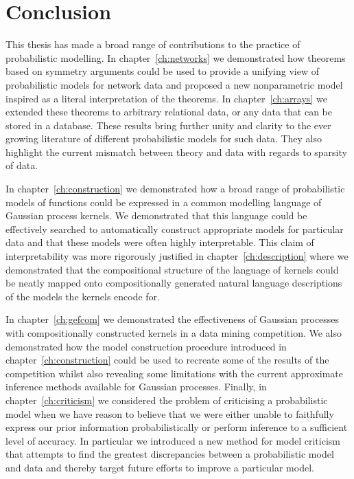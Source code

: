 
\inbpdocument

\chapter{Conclusion}
\label{ch:conclusion}

This thesis has made a broad range of contributions to the practice of probabilistic modelling.
In chapter~\ref{ch:networks} we demonstrated how theorems based on symmetry arguments could be used to provide a unifying view of probabilistic models for network data and proposed a new nonparametric model inspired as a literal interpretation of the theorems.
In chapter~\ref{ch:arrays} we extended these theorems to arbitrary relational data, or any data that can be stored in a database.
These results bring further unity and clarity to the ever growing literature of different probabilistic models for such data.
They also highlight the current mismatch between theory and data with regards to sparsity of data.

In chapter~\ref{ch:construction} we demonstrated how a broad range of probabilistic models of functions could be expressed in a common modelling language of Gaussian process kernels.
We demonstrated that this language could be effectively searched to automatically construct appropriate models for particular data and that these models were often highly interpretable.
This claim of interpretability was more rigorously justified in chapter~\ref{ch:description} where we demonstrated that the compositional structure of the language of kernels could be neatly mapped onto compositionally generated natural language descriptions of the models the kernels encode for.

In chapter~\ref{ch:gefcom} we demonstrated the effectiveness of Gaussian processes with compositionally constructed kernels in a data mining competition.
We also demonstrated how the model construction procedure introduced in chapter~\ref{ch:construction} could be used to recreate some of the results of the competition whilst also revealing some limitations with the current approximate inference methods available for Gaussian processes.
Finally, in chapter~\ref{ch:criticism} we considered the problem of criticising a probabilistic model when we have reason to believe that we were either unable to faithfully express our prior information probabilistically or perform inference to a sufficient level of accuracy.
In particular we introduced a new method for model criticism that attempts to find the greatest discrepancies between a probabilistic model and data and thereby target future efforts to improve a particular model.

\outbpdocument{


}
